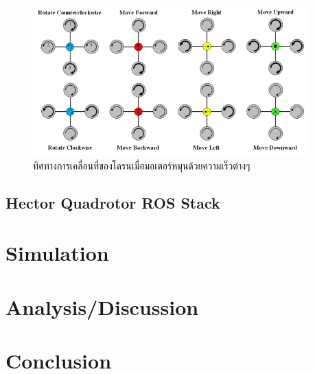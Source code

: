 \documentclass{classes/fiboReport}
\begin{document}
\begin{figure}[!ht]
	\centering
	\includegraphics[width=0.95\textwidth]{images/Quadcopter_Movement.png}
	\caption{ทิศทางการเคลื่อนที่ของโดรนเมื่อมอเตอร์หมุนด้วยความเร็วต่างๆ}
	\label{fig:quadroter_movement}
\end{figure}










\clearpage
\section{Hector Quadrotor ROS Stack}



\chapter{Simulation}






\chapter{Analysis/Discussion}
\chapter{Conclusion}


\nocite{*}


\end{document}
